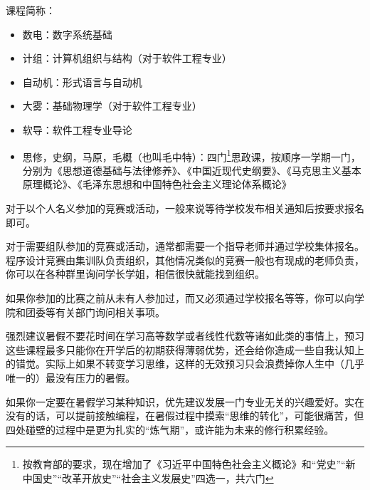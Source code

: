 课程简称：
\begin{itemize}
    \item 数电：数字系统基础
    \item 计组：计算机组织与结构（对于软件工程专业）
    \item 自动机：形式语言与自动机
    \item 大雾：基础物理学（对于软件工程专业）
    \item 软导：软件工程专业导论
    \item 思修，史纲，马原，毛概（也叫毛中特）：四门\footnote{按教育部的要求，现在增加了《习近平中国特色社会主义概论》和“党史”“新中国史”“改革开放史”“社会主义发展史”四选一，共六门}思政课，按顺序一学期一门，分别为《思想道德基础与法律修养》、《中国近现代史纲要》、《马克思主义基本原理概论》、《毛泽东思想和中国特色社会主义理论体系概论》
\end{itemize}


对于以个人名义参加的竞赛或活动，一般来说等待学校发布相关通知后按要求报名即可。

对于需要组队参加的竞赛或活动，通常都需要一个指导老师并通过学校集体报名。程序设计竞赛由集训队负责组织，其他情况类似的竞赛一般也有现成的老师负责，你可以在各种群里询问学长学姐，相信很快就能找到组织。

如果你参加的比赛之前从未有人参加过，而又必须通过学校报名等等，你可以向学院和团委等有关部门询问相关事项。


强烈建议暑假不要花时间在学习高等数学或者线性代数等诸如此类的事情上，预习这些课程最多只能你在开学后的初期获得薄弱优势，还会给你造成一些自我认知上的错觉。实际上如果不转变学习思维，这样的无效预习只会浪费掉你人生中（几乎唯一的）最没有压力的暑假。

如果你一定要在暑假学习某种知识，优先建议发展一门专业无关的兴趣爱好。实在没有的话，可以提前接触编程，在暑假过程中摸索“思维的转化”，可能很痛苦，但四处碰壁的过程中是更为扎实的“炼气期”，或许能为未来的修行积累经验。

